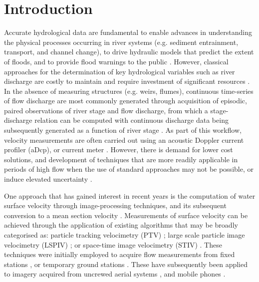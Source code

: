 \documentclass[hess, manuscript]{copernicus} %
\begin{document}
\section{Introduction}
Accurate hydrological data are fundamental to enable advances in understanding the physical processes occurring in river systems (e.g. sediment entrainment, transport, and channel change), to drive hydraulic models that predict the extent of floods, and to provide flood warnings to the public \citep{McMillan2017,Tauro2018}. However, classical approaches for the determination of key hydrological variables such as river discharge are costly to maintain and require investment of significant resources \citep{Fekete2007}. In the absence of measuring structures (e.g. weirs, flumes), continuous time-series of flow discharge are most commonly generated through acquisition of episodic, paired observations of river stage and flow discharge, from which a stage-discharge relation can be computed with continuous discharge data being subsequently generated as a function of river stage \citep{Kiang2018}. As part of this workflow, velocity measurements are often carried out using an acoustic Doppler current profiler (aDcp), or current meter \citep{Herschy2014}. However, there is demand for lower cost solutions, and development of techniques that are more readily applicable in periods of high flow when the use of standard approaches may not be possible, or induce elevated uncertainty \citep{Kidson2005, Baldassarre2009}. 

One approach that has gained interest in recent years is the computation of water surface velocity through image-processing techniques, and its subsequent conversion to a mean section velocity \citep{Jolley2021}. Measurements of surface velocity can be achieved through the application of existing algorithms that may be broadly categorised as: particle tracking velocimetry (PTV) \citep{Brevis2011,Tauro2017b}; large scale particle image velocimetry (LSPIV) \citep{Fujita1998, Muste2008}; or space-time image velocimetry (STIV) \citep{Fujita2007}. These techniques were initially employed to acquire flow measurements from fixed stations \citep{Bradley2002,Hauet2008,Stumpf2016}, or temporary ground stations \citep{Jodeau2008, Kim2008, Dramais2011}. These have subsequently been applied to imagery acquired from uncrewed aerial systems \citep[e.g., ][]{Lewis2018, Masafu2022}, and mobile phones \citep[e.g., DischargeApp; ][]{Haro2021}. 
\end{document}
